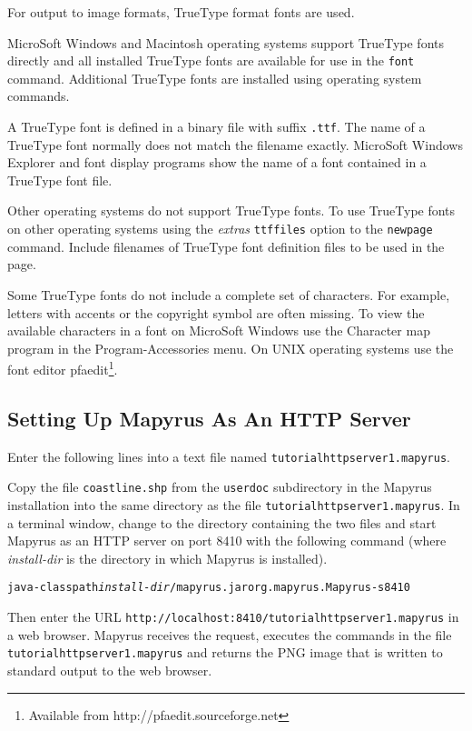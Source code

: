For output to image formats, TrueType format fonts are used.

MicroSoft Windows and Macintosh operating systems support TrueType
fonts directly and all installed TrueType fonts are available
for use in the \texttt{font} command.
Additional TrueType fonts are installed using operating system commands.

A TrueType font is defined in a binary file with suffix
\texttt{.ttf}.
The name of a TrueType font normally does not match the filename exactly.
MicroSoft Windows Explorer and font display programs show the name of
a font contained in a TrueType font file.

Other operating systems do not support TrueType fonts.  To use TrueType fonts
on other operating systems using the \textit{extras} \texttt{ttffiles} option
to the \texttt{newpage} command.  Include filenames of TrueType font definition
files to be used in the page.

Some TrueType fonts do not include a complete set of characters.
For example, letters with accents or the copyright symbol are often
missing.  To view the available characters in a font on MicroSoft Windows
use the Character map program in the Program-Accessories
menu.  On UNIX operating systems use the font editor
pfaedit\footnote{Available from http://pfaedit.sourceforge.net}.

\subsection{Setting Up Mapyrus As An HTTP Server}
\label{tutorialhttpserver}

Enter the following lines into a text file named
\texttt{tutorialhttpserver1.mapyrus}.



Copy the file \texttt{coastline.shp} from the \texttt{userdoc}
subdirectory in the
Mapyrus installation into the same directory as the file
\texttt{tutorialhttpserver1.mapyrus}.  In a terminal window, change to the
directory containing the two files and start Mapyrus as an HTTP server on port
8410 with the following command
(where \textit{install-dir} is the directory in which Mapyrus is installed).

\begin{alltt}
java -classpath \textit{install-dir}/mapyrus.jar org.mapyrus.Mapyrus -s 8410
\end{alltt}

Then enter the URL \texttt{http://localhost:8410/tutorialhttpserver1.mapyrus} in a
web browser.  Mapyrus receives the request, executes the commands in the file
\texttt{tutorialhttpserver1.mapyrus} and returns the PNG image that is written to
standard output to the web browser.


